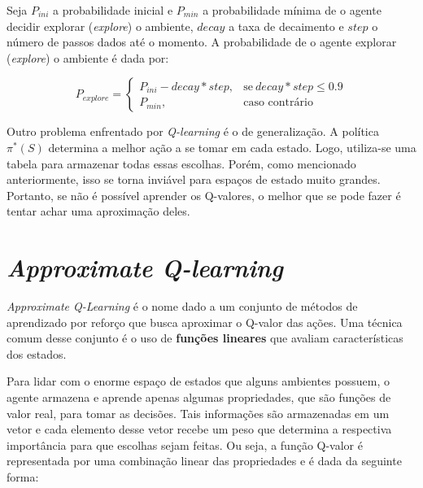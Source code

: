 Seja $P_{ini}$ a probabilidade inicial e $P_{min}$ a probabilidade mínima de o agente decidir explorar (\textit{explore}) o ambiente, $decay$ a taxa de decaimento e $step$ o número de passos dados até o momento.
A probabilidade de o agente explorar (\textit{explore}) o ambiente é dada por:

\begin{equation} \label{eq:exp_exp_prob}
P_{explore} =
\begin{cases}
P_{ini} - decay * step, & \text{se}\ decay * step \leq 0.9 \\
P_{min}, & \text{caso contrário}
\end{cases}
\end{equation}

Outro problema enfrentado por \textit{Q-learning} é o de generalização.
A política $\pi^{*}(S)$ determina a melhor ação a se tomar em cada estado.
Logo, utiliza-se uma tabela para armazenar todas essas escolhas.
Porém, como mencionado anteriormente, isso se torna inviável para espaços de estado muito grandes.
Portanto, se não é possível aprender os Q-valores, o melhor que se pode fazer é tentar achar uma aproximação deles.


\section{\textit{Approximate Q-learning}}
\label{sec:aql}

\textit{Approximate Q-Learning} é o nome dado a um conjunto de métodos de aprendizado por reforço que busca aproximar o Q-valor das ações.
Uma técnica comum desse conjunto é o uso de \textbf{funções lineares} que avaliam características dos estados.

Para lidar com o enorme espaço de estados que alguns ambientes possuem, o agente armazena e aprende apenas algumas propriedades, que são funções de valor real, para tomar as decisões.
Tais informações são armazenadas em um vetor e cada elemento desse vetor recebe um peso que determina a respectiva importância para que escolhas sejam feitas. Ou seja, a função Q-valor é representada por uma combinação linear das propriedades e é dada da seguinte forma:

